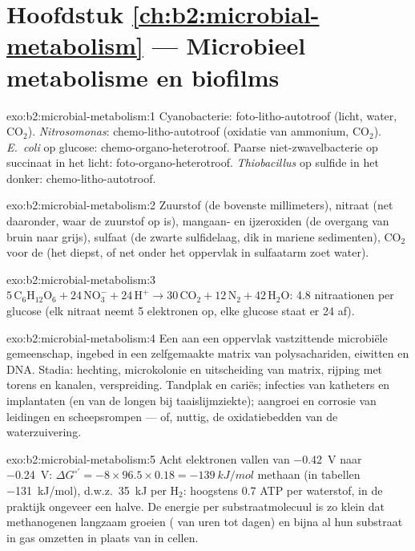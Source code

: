 \section*{Hoofdstuk \ref{ch:b2:microbial-metabolism} --- Microbieel metabolisme en biofilms}

\begin{solution}{exo:b2:microbial-metabolism:1}
Cyanobacterie: foto-litho-autotroof (licht, water, $\mathrm{CO_2}$).
\emph{Nitrosomonas}: chemo-litho-autotroof (oxidatie van ammonium,
$\mathrm{CO_2}$). \emph{E.~coli} op glucose: chemo-organo-heterotroof.
Paarse niet-zwavelbacterie op succinaat in het licht:
foto-organo-heterotroof. \emph{Thiobacillus} op sulfide in het donker:
chemo-litho-autotroof.
\end{solution}

\begin{solution}{exo:b2:microbial-metabolism:2}
Zuurstof (de bovenste millimeters), nitraat (net daaronder, waar de
zuurstof op is), mangaan- en ijzeroxiden (de overgang van bruin naar
grijs), sulfaat (de zwarte sulfidelaag, dik in mariene sedimenten),
$\mathrm{CO_2}$ voor de  (het diepst, of net onder het
oppervlak in sulfaatarm zoet water).
\end{solution}

\begin{solution}{exo:b2:microbial-metabolism:3}
$5\,\mathrm{C_6H_{12}O_6} + 24\,\mathrm{NO_3^-} + 24\,\mathrm{H^+}
\to 30\,\mathrm{CO_2} + 12\,\mathrm{N_2} + 42\,\mathrm{H_2O}$: 4.8
nitraationen per glucose (elk nitraat neemt 5 elektronen op, elke
glucose staat er 24 af).
\end{solution}

\begin{solution}{exo:b2:microbial-metabolism:4}
Een aan een oppervlak vastzittende microbiële gemeenschap, ingebed in
een zelfgemaakte matrix van polysachariden, eiwitten en DNA. Stadia:
hechting, microkolonie en uitscheiding van matrix, rijping met torens en
kanalen, verspreiding. Tandplak en cariës; infecties van katheters en
implantaten (en van de longen bij taaislijmziekte); aangroei en corrosie
van leidingen en scheepsrompen --- of, nuttig, de oxidatiebedden van de
waterzuivering.
\end{solution}

\begin{solution}{exo:b2:microbial-metabolism:5}
Acht elektronen vallen van \qty{-0.42}{V} naar \qty{-0.24}{V}:
$\Delta G^{\circ\prime} = -8\times 96.5\times 0.18 =
\qty{-139}{kJ/mol}$ methaan (in tabellen \qty{-131}{kJ/mol}), d.w.z.\
\qty{35}{kJ} per $\mathrm{H_2}$: hoogstens 0.7 ATP per waterstof, in de
praktijk ongeveer een halve. De energie per substraatmolecuul is zo
klein dat methanogenen langzaam groeien ( van uren tot
dagen) en bijna al hun substraat in gas omzetten in plaats van in
cellen.
\end{solution}

